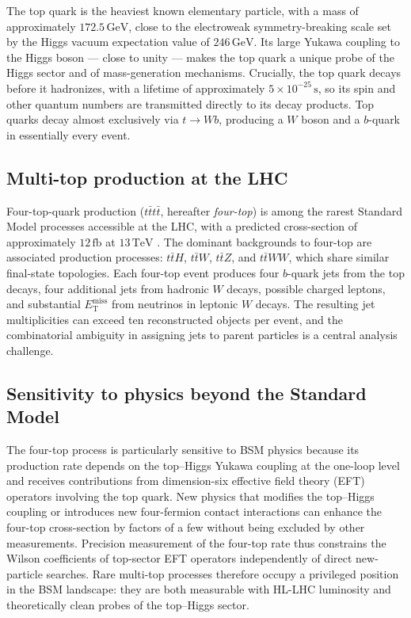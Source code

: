 The top quark is the heaviest known elementary particle, with a mass of approximately $172.5\,\mathrm{GeV}$, close to the electroweak symmetry-breaking scale set by the Higgs vacuum expectation value of $246\,\mathrm{GeV}$.
Its large Yukawa coupling to the Higgs boson --- close to unity --- makes the top quark a unique probe of the Higgs sector and of mass-generation mechanisms.
Crucially, the top quark decays before it hadronizes, with a lifetime of approximately $5 \times 10^{-25}\,\mathrm{s}$, so its spin and other quantum numbers are transmitted directly to its decay products.
Top quarks decay almost exclusively via $t \to Wb$, producing a $W$ boson and a $b$-quark in essentially every event.

\subsection{Multi-top production at the LHC}
\label{subsec:intro_multi_top_production}

Four-top-quark production ($t\bar{t}t\bar{t}$, hereafter \textit{four-top}) is among the rarest Standard Model processes accessible at the LHC, with a predicted cross-section of approximately $12\,\mathrm{fb}$ at $13\,\mathrm{TeV}$ \cite{collaborationObservationFourtopquarkProduction2023}.
The dominant backgrounds to four-top are associated production processes: $t\bar{t}H$, $t\bar{t}W$, $t\bar{t}Z$, and $t\bar{t}WW$, which share similar final-state topologies.
Each four-top event produces four $b$-quark jets from the top decays, four additional jets from hadronic $W$ decays, possible charged leptons, and substantial $E_{\mathrm{T}}^{\mathrm{miss}}$ from neutrinos in leptonic $W$ decays.
The resulting jet multiplicities can exceed ten reconstructed objects per event, and the combinatorial ambiguity in assigning jets to parent particles is a central analysis challenge.


\subsection{Sensitivity to physics beyond the Standard Model}
\label{subsec:intro_bsm_sensitivity}

The four-top process is particularly sensitive to BSM physics because its production rate depends on the top--Higgs Yukawa coupling at the one-loop level and receives contributions from dimension-six effective field theory (EFT) operators involving the top quark.
New physics that modifies the top--Higgs coupling or introduces new four-fermion contact interactions can enhance the four-top cross-section by factors of a few without being excluded by other measurements.
Precision measurement of the four-top rate thus constrains the Wilson coefficients of top-sector EFT operators independently of direct new-particle searches.
Rare multi-top processes therefore occupy a privileged position in the BSM landscape: they are both measurable with HL-LHC luminosity and theoretically clean probes of the top--Higgs sector.


